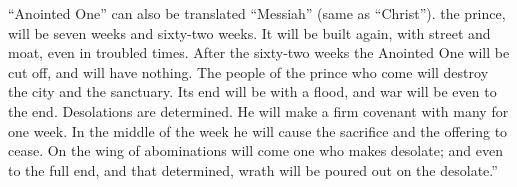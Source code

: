 {{“Anointed One” can also be translated “Messiah” (same as “Christ”).} the prince, will be seven weeks and sixty-two weeks. It will be built again, with street and moat, even in troubled times.
After the sixty-two weeks the Anointed One will be cut off, and will have nothing. The people of the prince who come will destroy the city and the sanctuary. Its end will be with a flood, and war will be even to the end. Desolations are determined.
He will make a firm covenant with many for one week. In the middle of the week he will cause the sacrifice and the offering to cease. On the wing of abominations will come one who makes desolate; and even to the full end, and that determined, wrath will be poured out on the desolate.”

}
